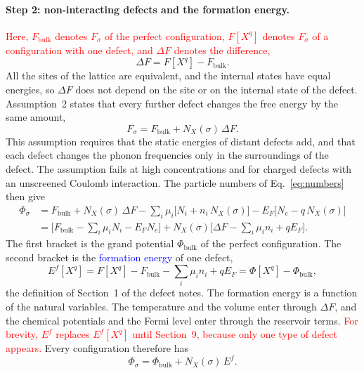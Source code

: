 \documentclass[11pt]{article}      %
\numberwithin{equation}{section}   %
\begin{document}
\paragraph{Step 2: non-interacting defects and the formation energy.}
\textcolor{red}{Here, $F_{\text{bulk}}$ denotes $F_\sigma$ of the perfect
configuration, $F[X^q]$ denotes $F_\sigma$ of a configuration with one
defect, and $\Delta F$ denotes the difference,}
\begin{equation*}
    \Delta F=F[X^q]-F_{\text{bulk}}.
\end{equation*}
All the sites of the lattice are equivalent, and the internal states have
equal energies, so $\Delta F$ does not depend on the site or on the internal
state of the defect. Assumption~2 states that every further defect changes
the free energy by the same amount,
\begin{equation}
    \boxed{F_\sigma=F_{\text{bulk}}+N_X(\sigma)\,\Delta F.}
    \label{eq:assumption2}
\end{equation}
This assumption requires that the static energies of distant defects add,
and that each defect changes the phonon frequencies only in the surroundings
of the defect. The assumption fails at high concentrations and for charged
defects with an unscreened Coulomb interaction. The particle numbers of
Eq.~\eqref{eq:numbers} then give
\begin{align*}
    \Phi_\sigma
    &=F_{\text{bulk}}+N_X(\sigma)\,\Delta F
    -\sum_i\mu_i\big[N_i+n_i\,N_X(\sigma)\big]
    -E_F\big[N_e-q\,N_X(\sigma)\big]\\
    &=\Big[F_{\text{bulk}}-\sum_i\mu_iN_i-E_FN_e\Big]
    +N_X(\sigma)\Big[\Delta F-\sum_i\mu_in_i+qE_F\Big].
\end{align*}
The first bracket is the grand potential $\Phi_{\text{bulk}}$ of the perfect
configuration. The second bracket is the \textcolor{blue}{formation energy}
of one defect,
\begin{equation}
    \boxed{E^f[X^q]=F[X^q]-F_{\text{bulk}}-\sum_i\mu_in_i+qE_F
    =\Phi[X^q]-\Phi_{\text{bulk}},}
    \label{eq:Ef}
\end{equation}
the definition of Section~1 of the defect notes. The formation energy is a
function of the natural variables. The temperature and the volume enter
through $\Delta F$, and the chemical potentials and the Fermi level enter
through the reservoir terms. \textcolor{red}{For brevity, $E^f$ replaces
$E^f[X^q]$ until Section~9, because only one type of defect appears.} Every
configuration therefore has
\begin{equation}
    \boxed{\Phi_\sigma=\Phi_{\text{bulk}}+N_X(\sigma)\,E^f.}
    \label{eq:phi-sigma}
\end{equation}
\end{document}
